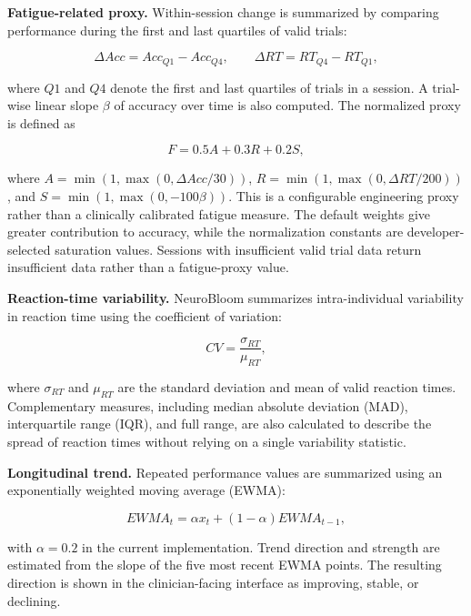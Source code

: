 \documentclass[preprint,12pt,a4paper]{elsarticle}
\begin{document}
\textbf{Fatigue-related proxy.}
Within-session change is summarized by comparing performance during the
first and last quartiles of valid trials:

\begin{equation}
\Delta Acc = Acc_{Q1} - Acc_{Q4}, \qquad
\Delta RT = RT_{Q4} - RT_{Q1},
\end{equation}

where $Q1$ and $Q4$ denote the first and last quartiles of trials in a
session. A trial-wise linear slope $\beta$ of accuracy over time is also
computed. The normalized proxy is defined as

\begin{equation}
F = 0.5A + 0.3R + 0.2S,
\end{equation}

where
$A=\min(1,\max(0,\Delta Acc/30))$,
$R=\min(1,\max(0,\Delta RT/200))$, and
$S=\min(1,\max(0,-100\beta))$.
This is a configurable engineering proxy rather than a clinically calibrated
fatigue measure. The default weights give greater contribution to accuracy,
while the normalization constants are developer-selected saturation values.
Sessions with insufficient valid trial data return insufficient data rather
than a fatigue-proxy value.

\textbf{Reaction-time variability.}
NeuroBloom summarizes intra-individual variability in reaction time using
the coefficient of variation:

\begin{equation}
CV = \frac{\sigma_{RT}}{\mu_{RT}},
\end{equation}

where $\sigma_{RT}$ and $\mu_{RT}$ are the standard deviation and mean of
valid reaction times. Complementary measures, including median absolute
deviation (MAD), interquartile range (IQR), and full range, are also
calculated to describe the spread of reaction times without relying on a
single variability statistic.

\textbf{Longitudinal trend.}
Repeated performance values are summarized using an exponentially weighted
moving average (EWMA):

\begin{equation}
EWMA_t = \alpha x_t + (1-\alpha)EWMA_{t-1},
\end{equation}

with $\alpha=0.2$ in the current implementation. Trend direction and
strength are estimated from the slope of the five most recent EWMA points.
The resulting direction is shown in the clinician-facing interface as
improving, stable, or declining.
\end{document}
